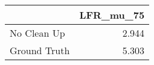 \begin{tabular}{lr}
\toprule
{} & LFR_mu_75 \\
\midrule
No Clean Up  &     2.944 \\
Ground Truth &     5.303 \\
\bottomrule
\end{tabular}
